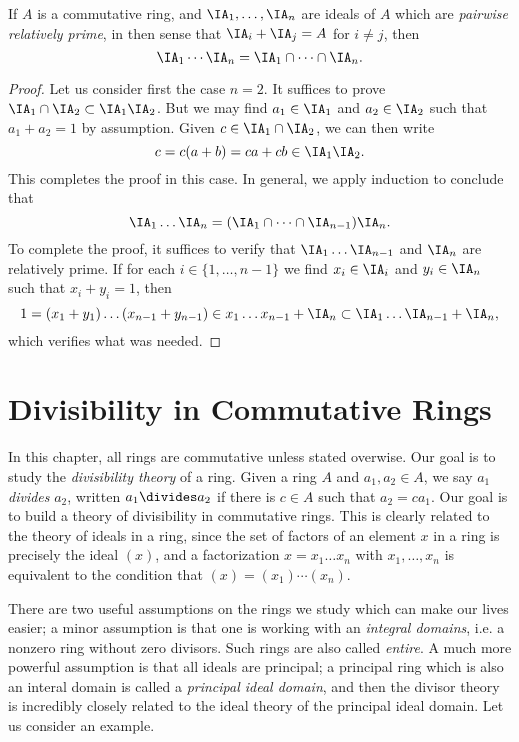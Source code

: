\begin{lemma}
    If $A$ is a commutative ring, and $\IA_1,\dots, \IA_n$ are ideals of $A$ which are \emph{pairwise relatively prime}, in then sense that $\IA_i + \IA_j = A$ for $i \neq j$, then
    \[ \IA_1 \cdots \IA_n = \IA_1 \cap \dots \cap \IA_n. \]
\end{lemma}
\begin{proof}
    Let us consider first the case $n = 2$. It suffices to prove $\IA_1 \cap \IA_2 \subset \IA_1 \IA_2$. But we may find $a_1 \in \IA_1$ and $a_2 \in \IA_2$ such that $a_1 + a_2 = 1$ by assumption. Given $c \in \IA_1 \cap \IA_2$, we can then write
    \[ c = c(a + b) = ca + cb \in \IA_1 \IA_2. \]
    This completes the proof in this case. In general, we apply induction to conclude that
    \[ \IA_1 \dots \IA_n = (\IA_1 \cap \dots \cap \IA_{n-1}) \IA_n. \]
    To complete the proof, it suffices to verify that $\IA_1 \dots \IA_{n-1}$ and $\IA_n$ are relatively prime. If for each $i \in \{ 1, \dots, n-1 \}$ we find $x_i \in \IA_i$ and $y_i \in \IA_n$ such that $x_i + y_i = 1$, then
    \[ 1 = (x_1 + y_1) \dots (x_{n-1} + y_{n-1}) \in x_1 \dots x_{n-1} + \IA_n \subset \IA_1 \dots \IA_{n-1} + \IA_n, \]
    which verifies what was needed.
\end{proof}

\chapter{Divisibility in Commutative Rings}

In this chapter, all rings are commutative unless stated overwise. Our goal is to study the \emph{divisibility theory} of a ring. Given a ring $A$ and $a_1,a_2 \in A$, we say $a_1$ \emph{divides} $a_2$, written $a_1 \divides a_2$ if there is $c \in A$ such that $a_2 = ca_1$. Our goal is to build a theory of divisibility in commutative rings. This is clearly related to the theory of ideals in a ring, since the set of factors of an element $x$ in a ring is precisely the ideal $(x)$, and a factorization $x = x_1 \dots x_n$ with $x_1, \dots, x_n$ is equivalent to the condition that $(x) = (x_1) \cdots (x_n)$.

There are two useful assumptions on the rings we study which can make our lives easier; a minor assumption is that one is working with an \emph{integral domains}, i.e. a nonzero ring without zero divisors. Such rings are also called \emph{entire}. A much more powerful assumption is that all ideals are principal; a principal ring which is also an interal domain is called a \emph{principal ideal domain}, and then the divisor theory is incredibly closely related to the ideal theory of the principal ideal domain. Let us consider an example.

